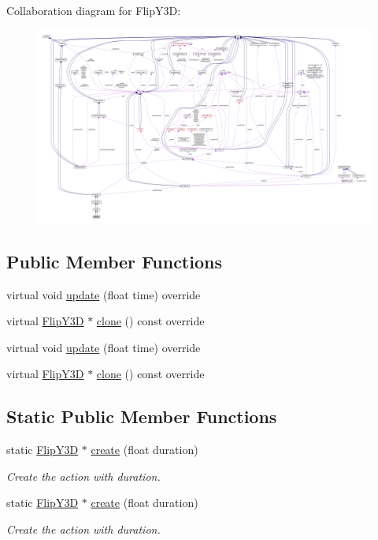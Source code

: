 Collaboration diagram for Flip\+Y3D\+:
\nopagebreak
\begin{figure}[H]
\begin{center}
\leavevmode
\includegraphics[width=350pt]{classFlipY3D__coll__graph}
\end{center}
\end{figure}
\subsection*{Public Member Functions}
\begin{DoxyCompactItemize}
\item 
virtual void \hyperlink{classFlipY3D_ad3c0474d05070c8defea64cc4d47d8b6}{update} (float time) override
\item 
virtual \hyperlink{classFlipY3D}{Flip\+Y3D} $\ast$ \hyperlink{classFlipY3D_a797e0c0669bd83473d66dc8d77d49daa}{clone} () const override
\item 
virtual void \hyperlink{classFlipY3D_a19706da07e07cdad9cf19509a2bb0bff}{update} (float time) override
\item 
virtual \hyperlink{classFlipY3D}{Flip\+Y3D} $\ast$ \hyperlink{classFlipY3D_a4553fc238ade03f1926ba12458ad073b}{clone} () const override
\end{DoxyCompactItemize}
\subsection*{Static Public Member Functions}
\begin{DoxyCompactItemize}
\item 
static \hyperlink{classFlipY3D}{Flip\+Y3D} $\ast$ \hyperlink{classFlipY3D_a5c6d047f9fb65c70ba71a94a675307db}{create} (float duration)
\begin{DoxyCompactList}\small\item\em Create the action with duration. \end{DoxyCompactList}\item 
static \hyperlink{classFlipY3D}{Flip\+Y3D} $\ast$ \hyperlink{classFlipY3D_aea35c54194cefee880d3756530e98bf5}{create} (float duration)
\begin{DoxyCompactList}\small\item\em Create the action with duration. \end{DoxyCompactList}\end{DoxyCompactItemize}
